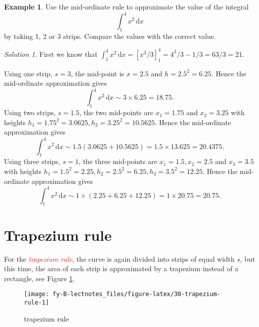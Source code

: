 \documentclass[
  11pt,
  oneside]{book}
\newcommand{\slide}{}
\theoremstyle{definition}
\theoremstyle{definition}
\newtheorem{example}{Example}[chapter]
\theoremstyle{definition}
\theoremstyle{definition}
\theoremstyle{remark}
\newtheorem*{solution}{Solution}
\begin{document}
\slide

\begin{example}
Use the mid-ordinate rule to approximate the value of the integral
\[
\int_1^4x^2\,\mathrm{d}x
\]
by taking 1, 2 or 3 strips. Compare the values with the correct value.
\end{example}

\begin{solution}
First we know that \(\displaystyle\int_1^4 x^2\,\mathrm{d}x = [x^3/3]_1^4 = 4^3/3-1/3 = 63/3 = 21\).

Using one strip, \(s=3\), the mid-point is \(x=2.5\) and \(h=2.5^2 = 6.25\). Hence the mid-ordinate approximation gives
\[
\int_1^4 x^2 \,\mathrm{d}x \sim 3\times 6.25 = 18.75.
\]
Using two strips, \(s=1.5\), the two mid-points are \(x_1=1.75\) and \(x_2=3.25\) with heights \(h_1=1.75^2=3.0625, h_2=3.25^2=10.5625\). Hence the mid-ordinate approximation gives
\[
\int_1^4 x^2 \,\mathrm{d}x \sim 1.5(3.0625+10.5625)=1.5\times13.625 = 20.4375.
\]
Using three strips, \(s=1\), the three mid-points are \(x_1=1.5, x_2=2.5\) and \(x_3=3.5\) with heights \(h_1=1.5^2=2.25, h_2=2.5^2=6.25, h_3=3.5^2=12.25\). Hence the mid-ordinate approximation gives
\[
\int_1^4 x^2 \,\mathrm{d}x \sim 1\times(2.25+6.25+12.25)=1\times20.75 = 20.75.
\]
\end{solution}

\slide

\begin{slidesonly}

\hbox{}
\slide

\end{slidesonly}

\section{Trapezium rule}\label{trapezium-rule}

For the \textcolor{red}{\em trapezium rule}, the curve is again divided into strips of equal width \(s\), but this time, the area of each strip is approximated by a trapezium instead of a rectangle, see Figure \ref{fig:30-trapezium-rule}.

\begin{figure}

{\centering \texttt{[image: fy-B-lectnotes\_files/figure-latex/30-trapezium-rule-1]} 

}

\caption{trapezium rule}\label{fig:30-trapezium-rule}
\end{figure}
\end{document}
